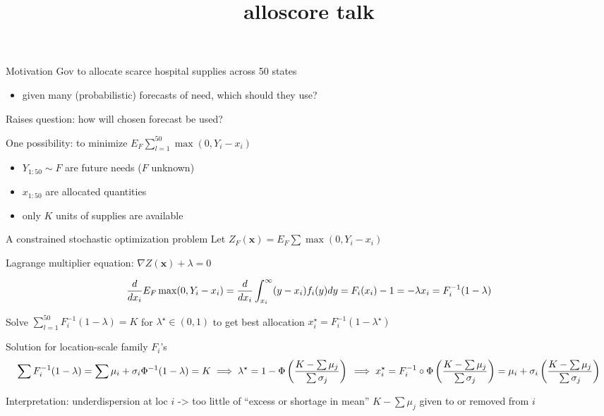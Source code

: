 \documentclass[
  ignorenonframetext,
]{beamer}
\title{alloscore talk}
\author{}
\date{}
\providecommand{\tightlist}{%
  \setlength{\itemsep}{0pt}\setlength{\parskip}{0pt}}\usepackage{longtable,booktabs,array}
\begin{document}
\frame{\titlepage}
\ifdefined\Shaded\renewenvironment{Shaded}{\begin{tcolorbox}[borderline west={3pt}{0pt}{shadecolor}, enhanced, interior hidden, breakable, sharp corners, frame hidden, boxrule=0pt]}{\end{tcolorbox}}\fi

\begin{frame}{Motivation}
\protect\hypertarget{motivation}{}
Gov to allocate scarce hospital supplies across 50 states

\begin{itemize}
\tightlist
\item
  given many (probabilistic) forecasts of need, which should they use?
\end{itemize}

Raises question: how will chosen forecast be used?

One possibility: to minimize \(E_F \sum_{l=1}^{50} \max(0, Y_i - x_i)\)

\begin{itemize}
\tightlist
\item
  \(Y_{1:50} \sim F\) are future needs (\(F\) unknown)
\item
  \(x_{1:50}\) are allocated quantities
\item
  only \(K\) units of supplies are available
\end{itemize}
\end{frame}

\begin{frame}{A constrained stochastic optimization problem}
\protect\hypertarget{a-constrained-stochastic-optimization-problem}{}
Let \(Z_F(\mathbf{x}) = E_F \sum \max(0, Y_i - x_i)\)

Lagrange multiplier equation: \(\nabla Z(\mathbf{x}) + \lambda =0\)

\[
\frac{d}{dx_i}E_F \max(0, Y_i - x_i) = \frac{d}{dx_i}\int_{x_i}^{\infty} (y - x_i)f_i(y)dy = F_i(x_i)-1 = -\lambda\\
x_i = F_i^{-1}(1-\lambda)
\]

Solve \(\sum_{l=1}^{50} F_i^{-1}(1-\lambda) = K\) for
\(\lambda^{\star} \in (0,1)\) to get best allocation
\(x_i^{\star} = F_i^{-1}(1-\lambda^{\star})\)
\end{frame}

\begin{frame}{Solution for location-scale family \(F_i\)'s}
\protect\hypertarget{solution-for-location-scale-family-f_is}{}
\[
\sum F_i^{-1}(1-\lambda) = \sum \mu_i + \sigma_i \Phi^{-1}(1-\lambda )= K \\
\implies \lambda^{\star} = 1 - \Phi\left(\frac{K-\sum \mu_j}{\sum \sigma_j}\right) \\
\implies x_i^{\star} = 
F_i^{-1}\circ\Phi\left(\frac{K-\sum \mu_j}{\sum \sigma_j}\right)
=\mu_i+\sigma_i\left(\frac{K-\sum \mu_j}{\sum \sigma_j}\right)
\]

Interpretation: underdispersion at loc \(i\) -\textgreater{} too little
of ``excess or shortage in mean'' \(K-\sum \mu_j\) given to or removed
from \(i\)
\end{frame}
\end{document}
